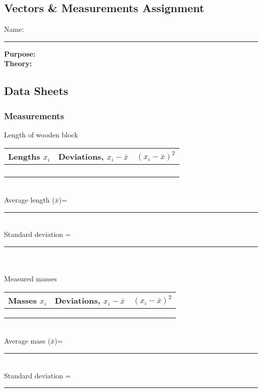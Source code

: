 \documentclass[main.tex]{subfiles}
\begin{document}
\newpage
\begin{doublespace}
\section{Vectors \& Measurements Assignment}
\begin{flushright}
Name:\rule[-1mm]{5cm}{.1pt}
\end{flushright}

\noindent
\textbf{Purpose:}
\\[4cm]
\textbf{Theory:}

\newpage
\subsection*{Data Sheets}
\subsubsection*{Measurements}

Length of wooden block\\

\begin{tabular}{|r|r|r|}
\hline
Lengths $x_i$ & Deviations, $x_i-\bar{x}$ & $(x_i-\bar{x})^2$\\
\hline
&&\\ \hline
&&\\ \hline
&&\\ \hline
&&\\ \hline
\end{tabular}\\

Average length ($\bar{x}$)= \rule[-1mm]{2.5cm}{.1pt}\\
Standard deviation =  \rule[-1mm]{2.5cm}{.1pt}\\ \\

Measured masses\\

\begin{tabular}{|r|r|r|}
\hline
Masses $x_i$ & Deviations, $x_i-\bar{x}$ & $(x_i-\bar{x})^2$\\
\hline
&&\\ \hline
&&\\ \hline
&&\\ \hline
\end{tabular}\\

Average mass ($\bar{x}$)= \rule[-1mm]{2.5cm}{.1pt}\\
Standard deviation =  \rule[-1mm]{2.5cm}{.1pt}


\end{doublespace}
\end{document}
